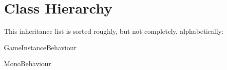 \section{Class Hierarchy}
This inheritance list is sorted roughly, but not completely, alphabetically\+:\begin{DoxyCompactList}
\item Game\+Instance\+Behaviour\begin{DoxyCompactList}
\item {}
\item {}
\item {}
\end{DoxyCompactList}
\item Mono\+Behaviour\begin{DoxyCompactList}
\item {}
\item {}
\item {}
\end{DoxyCompactList}
\end{DoxyCompactList}

